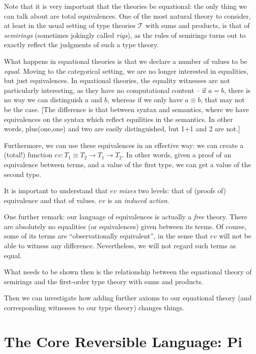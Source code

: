 \documentclass[preprint]{sigplanconf}
\begin{document}
Note that it is very important that the theories be equational: the only
thing we can talk about are total equivalences.  One of the most natural
theory to consider, at least in the usual setting of type theories
$\mathcal{T}$ with sums and products, is that of \emph{semirings} (sometimes
jokingly called \emph{rigs}), as the rules of semirings turns out to exactly
reflect the judgments of such a type theory.

What happens in equational theories is that we declare a number of values to
be \emph{equal}.  Moving to the categorical setting, we are no longer
interested in equalities, but just equivalences.  In equational theories, the
equality witnesses are not particularly interesting, as they have no
computational content -- if $a = b$, there is no way we can distinguish $a$
and $b$, whereas if we only have $a \equiv b$, that may not be the case.
[The difference is that between syntax and semantics, where we have
equivalences on the syntax which reflect equilities in the semantics.  In
other words, plus(one,one) and two are easily distinguished, but 1+1 and 2
are not.]

Furthermore, we can use these equivalences in an effective way: we can create
a (total!) function $ev : T_1 \equiv T_2 \rightarrow T_1 \rightarrow T_2$.
In other words, given a proof of an equivalence between terms, and a value of
the first type, we can get a value of the second type.

It is important to understand that $ev$ \emph{mixes} two levels: that of
(proofs of) equivalence and that of values.  $ev$ is an \emph{induced
  action}.

One further remark: our language of equivalences is actually a \emph{free}
theory.  There are absolutely no equalities (or equivalences) given between
its terms.  Of course, some of its terms are ``observationally equivalent'',
in the sense that $ev$ will not be able to witness any difference.
Nevertheless, we will not regard such terms as equal.

What needs to be shown then is the relationship between the equational theory
of semirings and the first-order type theory with sums and products.

Then we can investigate how adding further axioms to our equational theory
(and corresponding witnesses to our type theory) changes things.

\section{The Core Reversible Language: {{Pi}} }
\label{sec:pi}
\end{document}
